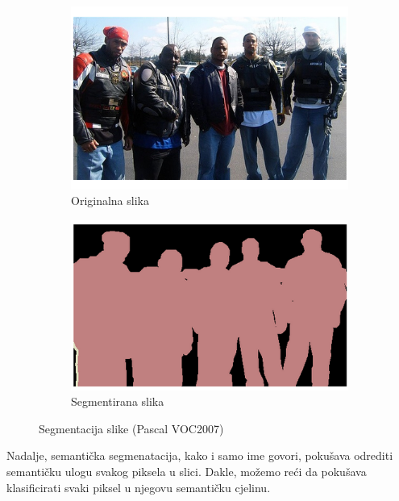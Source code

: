 \begin{enumerate}
\begin{figure}[htb]
	\centering
	\begin{subfigure}[b]{0.4\linewidth}
		\includegraphics[width=\linewidth]{img/OriginalImage.png}
		\caption{Originalna slika}
	\end{subfigure}
	\begin{subfigure}[b]{0.4\linewidth}
		\includegraphics[width=\linewidth]{img/ImageSegmentation.png}
		\caption{Segmentirana slika}
	\end{subfigure}
	\caption{Segmentacija slike (Pascal VOC2007)}
	\label{img:segmentation}
\end{figure}

Nadalje, semantička segmenatacija, kako i samo ime govori, pokušava odrediti semantičku ulogu svakog piksela u slici. Dakle, možemo reći da pokušava klasificirati svaki piksel u njegovu semantičku cjelinu. 


\end{enumerate}
